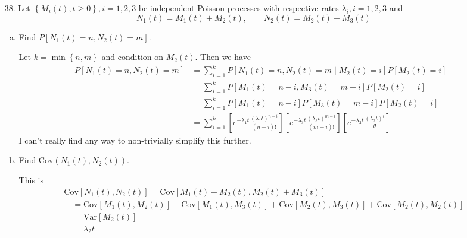 \documentclass{article}
\newcommand{\var}{\mathrm{Var}}
\newcommand{\cov}{\mathrm{Cov}}
\begin{document}
\begin{itemize}
	\item[38.] Let $\left\{ M_i(t), t\ge 0 \right\}, i=1, 2, 3$ be independent Poisson processes with respective rates $\lambda_i, i=1, 2, 3$ and
		\[N_1(t)=M_1(t)+M_2(t), \quad\quad N_2(t)=M_2(t)+M_3(t)\]
		\begin{enumerate}[(a)]
			\item Find $P[N_1(t)=n, N_2(t)=m].$
				\begin{soln}
					Let $k=\min\left\{ n, m \right\}$ and condition on $M_2(t).$ Then we have
					\begin{align*}
						P[N_1(t)=n, N_2(t)=m] &= \sum_{i=1}^{k} P[N_1(t)=n, N_2(t)=m\mid M_2(t)=i] P[M_2(t)=i] \\
						&= \sum_{i=1}^{k} P[M_1(t) = n-i, M_3(t)=m-i] P[M_2(t)=i] \\
						&= \sum_{i=1}^{k} P[M_1(t)=n-i]P[M_3(t)=m-i] P[M_2(t)=i] \\
						&= \sum_{i=1}^{k} \left[ e^{-\lambda_1 t} \frac{(\lambda_1 t)^{n-i}}{(n-i)!} \right]\left[ e^{-\lambda_3 t} \frac{(\lambda_3 t)^{m-i}}{(m-i)!}\right]\left[ e^{-\lambda_2 t} \frac{(\lambda_2 t)^i}{i!} \right]
					\end{align*}
					I can't really find any way to non-trivially simplify this further.
				\end{soln}

			\item Find $\cov(N_1(t), N_2(t)).$
				\begin{soln}
					This is
					\begin{align*}
						&\cov\left[ N_1(t), N_2(t) \right] = \cov\left[ M_1(t)+M_2(t), M_2(t)+M_3(t) \right] \\
						&\quad= \cov\left[ M_1(t), M_2(t) \right] + \cov\left[ M_1(t), M_3(t) \right] + \cov\left[ M_2(t), M_3(t) \right] + \cov\left[ M_2(t), M_2(t) \right] \\
						&\quad= \var\left[ M_2(t) \right] \\
						&\quad= \lambda_2 t
					\end{align*}
				\end{soln}

		\end{enumerate}


\end{itemize}
\end{document}
